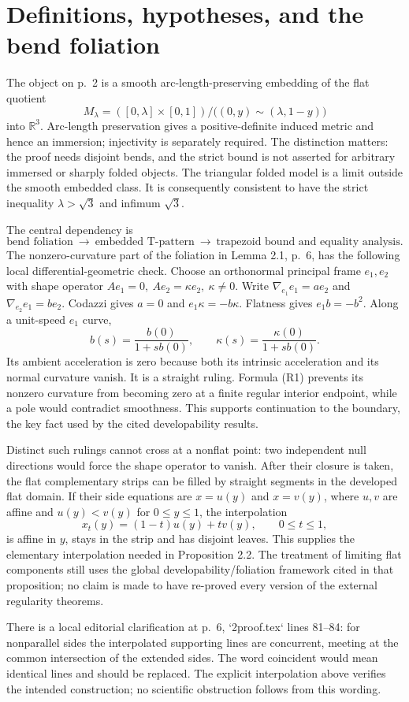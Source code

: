 \documentclass[10pt]{article}
\begin{document}
\section*{Definitions, hypotheses, and the bend foliation}
The object on p. 2 is a smooth arc-length-preserving embedding of the flat quotient \[M_\lambda=([0,\lambda]\times[0,1])/
       \bigl((0,y)\sim(\lambda,1-y)\bigr)\] into \(\mathbb R^3\). Arc-length preservation gives a positive-definite induced metric and hence an immersion; injectivity is separately required. The distinction matters: the proof needs disjoint bends, and the strict bound is not asserted for arbitrary immersed or sharply folded objects. The triangular folded model is a limit outside the smooth embedded class. It is consequently consistent to have the strict inequality \(\lambda>\sqrt3\) and infimum \(\sqrt3\).\par
The central dependency is \[\text{bend foliation}\ \longrightarrow\
 \text{embedded T-pattern}\ \longrightarrow\
 \text{trapezoid bound and equality analysis}.\] The nonzero-curvature part of the foliation in Lemma 2.1, p. 6, has the following local differential-geometric check. Choose an orthonormal principal frame \(e_1,e_2\) with shape operator \(Ae_1=0,\ Ae_2=\kappa e_2,\ \kappa\ne0\). Write \(\nabla_{e_1}e_1=a e_2\) and \(\nabla_{e_2}e_1=b e_2\). Codazzi gives \(a=0\) and \(e_1\kappa=-b\kappa\). Flatness gives \(e_1b=-b^2\). Along a unit-speed \(e_1\) curve, \[b(s)=\frac{b(0)}{1+s b(0)},\qquad
 \kappa(s)=\frac{\kappa(0)}{1+s b(0)}.
 \tag{R1}\] Its ambient acceleration is zero because both its intrinsic acceleration and its normal curvature vanish. It is a straight ruling. Formula (R1) prevents its nonzero curvature from becoming zero at a finite regular interior endpoint, while a pole would contradict smoothness. This supports continuation to the boundary, the key fact used by the cited developability results.\par
Distinct such rulings cannot cross at a nonflat point: two independent null directions would force the shape operator to vanish. After their closure is taken, the flat complementary strips can be filled by straight segments in the developed flat domain. If their side equations are \(x=u(y)\) and \(x=v(y)\), where \(u,v\) are affine and \(u(y)<v(y)\) for \(0\le y\le1\), the interpolation \[x_t(y)=(1-t)u(y)+t v(y),\qquad 0\le t\le1,\] is affine in \(y\), stays in the strip and has disjoint leaves. This supplies the elementary interpolation needed in Proposition 2.2. The treatment of limiting flat components still uses the global developability/foliation framework cited in that proposition; no claim is made to have re-proved every version of the external regularity theorems.\par
There is a local editorial clarification at p. 6, `2proof.tex` lines 81–84: for nonparallel sides the interpolated supporting lines are concurrent, meeting at the common intersection of the extended sides. The word coincident would mean identical lines and should be replaced. The explicit interpolation above verifies the intended construction; no scientific obstruction follows from this wording.\par
\end{document}
